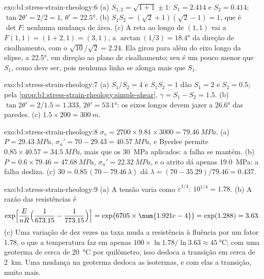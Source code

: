 \begin{solution}{exo:b1:stress-strain-rheology:6}
(a) $S_{1,2} = \sqrt{1 + 1} \pm 1$: $S_1 = 2.414$ e $S_2 = 0.414$;
$\tan2\theta' = 2/2 = 1$, $\theta' = \ang{22.5}$. (b) $S_1S_2 =
(\sqrt2 + 1)(\sqrt2 - 1) = 1$, que é $\det F$: nenhuma mudança de área. (c) A
reta ao longo de $(1, 1)$ vai a $F(1, 1) = (1 + 2, 1) = (3, 1)$, a
$\arctan(1/3) = \ang{18.4}$ da direção de cisalhamento, com o 
$\sqrt{10}/\sqrt2 = 2.24$. Ela girou para além do eixo longo da elipse, a \ang{22.5}, em direção ao plano de cisalhamento; seu  é um pouco menor que
$S_1$, como deve ser, pois nenhuma linha se alonga mais que $S_1$.
\end{solution}

\begin{solution}{exo:b1:stress-strain-rheology:7}
(a) $S_1/S_2 = 4$ e $S_1S_2 = 1$ dão $S_1 = 2$ e $S_2 = 0.5$; pela
\cref{prop:b1:stress-strain-rheology:simple-shear}, $\gamma = S_1 - S_2 =
1.5$. (b) $\tan2\theta' = 2/1.5 = 1.333$, $2\theta' = \ang{53.1}$: os eixos longos devem jazer a \ang{26.6} das paredes. (c) $1.5\times200 = \qty{300}{m}$.
\end{solution}

\begin{solution}{exo:b1:stress-strain-rheology:8}
$\sigma_v = 2700\times9.81\times3000 = \qty{79.46}{MPa}$. (a) $P = \qty{29.43}{MPa}$,
$\sigma_n' = 70 - 29.43 = \qty{40.57}{MPa}$, e Byerlee permite
$0.85\times40.57 = \qty{34.5}{MPa}$, mais que os \qty{30}{MPa} aplicados: a
falha se mantém. (b) $P = 0.6\times79.46 = \qty{47.68}{MPa}$, $\sigma_n' =
\qty{22.32}{MPa}$, e o atrito dá apenas \qty{19.0}{MPa}: a falha
desliza. (c) $30 = 0.85\,(70 - 79.46\,\lambda)$ dá $\lambda = (70 -
35.29)/79.46 = 0.437$.
\end{solution}

\begin{solution}{exo:b1:stress-strain-rheology:9}
(a) A tensão varia como $\dot\varepsilon^{1/4}$: $10^{1/4} = 1.78$. (b) A
razão das resistências é
\[
  \exp\Bigl[\frac{E}{nR}\Bigl(\frac{1}{673.15} - \frac{1}{773.15}\Bigr)\Bigr]
  = \exp\bigl(6705\times\num{1.921e-4}\bigr) = \exp(1.288) = 3.63 .
\]
(c) Uma variação de dez vezes na taxa muda a resistência à fluência por um fator 1.78, o que a temperatura faz em apenas $100\times\ln1.78/\ln3.63 \approx
\qty{45}{\degreeCelsius}$; com uma geoterma de cerca de \qty{20}{\degreeCelsius}
por quilômetro, isso desloca a transição em cerca de \qty{2}{km}. Uma mudança
na geoterma desloca as isotermas, e com elas a transição, muito mais.
\end{solution}

